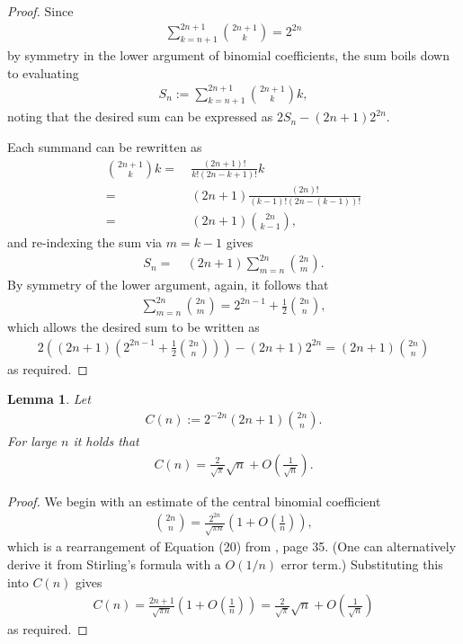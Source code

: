 \documentclass[12pt,reqno]{amsart}
\theoremstyle{plain} %
\newtheorem{lemma}[theorem]{Lemma}
\theoremstyle{remark}
\theoremstyle{definition}
\begin{document}
\begin{proof}
    Since
    \begin{align}
        \sum_{k=n+1}^{2n+1}\binom{2n+1}{k}=2^{2n}
    \end{align}
    by symmetry in the lower argument of binomial coefficients, the sum boils down to evaluating
    \begin{align}
        S_n:=\sum_{k=n+1}^{2n+1}\binom{2n+1}{k}k,
    \end{align}
    noting that the desired sum can be expressed as $2S_n-(2n+1)2^{2n}$.

    Each summand can be rewritten as
    \begin{align}
        \binom{2n+1}{k}k=&\ \frac{(2n+1)!}{k!(2n-k+1)!}k\\
        =&\ (2n+1)\frac{(2n)!}{(k-1)!(2n-(k-1))!}\\
        =&\ (2n+1)\binom{2n}{k-1},
    \end{align}
    and re-indexing the sum via $m=k-1$ gives
    \begin{align}
        S_n=&\ (2n+1)\sum_{m=n}^{2n}\binom{2n}{m}.
    \end{align}
    By symmetry of the lower argument, again, it follows that
    \begin{align}
        \sum_{m=n}^{2n}\binom{2n}{m}=2^{2n-1}+\frac{1}{2}\binom{2n}{n},
    \end{align}
    which allows the desired sum to be written as
    \begin{align}
        2\left((2n+1)\left(2^{2n-1}+\frac{1}{2}\binom{2n}{n}\right)\right)-(2n+1)2^{2n}=(2n+1)\binom{2n}{n}
    \end{align}
    as required.
\end{proof}

\begin{lemma}\label{lem: asymptotic}
    Let 
    \begin{align}
        C(n):=2^{-2n}(2n+1)\binom{2n}{n}.
    \end{align}
    For large $n$ it holds that
    \begin{align}
       C(n)=\frac{2}{\sqrt{\pi}}\sqrt{n}+O\left(\frac{1}{\sqrt{n}}\right).
    \end{align}
\end{lemma}
\begin{proof}
    We begin with an estimate of the central binomial coefficient
    \begin{align}
        \binom{2n}{n}=\frac{2^{2n}}{\sqrt{\pi n}}\left(1+O\left(\frac{1}{n}\right)\right),
    \end{align}
    which is a rearrangement of Equation (20) from \cite{YL}, page 35. (One can alternatively derive it from Stirling's formula with a $O(1/n)$ error term.) Substituting this into $C(n)$ gives
    \begin{align}
        C(n)=\frac{2n+1}{\sqrt{\pi n}}\left(1+O\left(\frac{1}{n}\right)\right)=\frac{2}{\sqrt{\pi}}\sqrt{n}+O\left(\frac{1}{\sqrt{n}}\right)
    \end{align}
    as required.
\end{proof}
\end{document}
